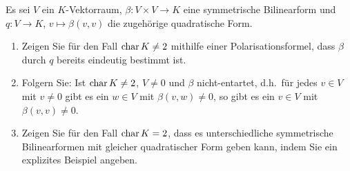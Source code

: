 \begin{question}[subtitle = Die Polarisationsformel(n)]{2}
  Es sei $V$ ein $K$-Vektorraum, $\beta \colon V \times V \to K$ eine symmetrische Bilinearform und $q \colon V \to K$, $v \mapsto \beta(v,v)$ die zugehörige quadratische Form.
  \begin{enumerate}[leftmargin=*]
    \item
      Zeigen Sie für den Fall $\operatorname{char} K \neq 2$ mithilfe einer Polarisationsformel, dass $\beta$ durch $q$ bereits eindeutig bestimmt ist.
    \item
      Folgern Sie:
      Ist $\operatorname{char} K \neq 2$, $V \neq 0$ und $\beta$ nicht-entartet, d.h.\ für jedes $v \in V$ mit $v \neq 0$ gibt es ein $w \in V$ mit $\beta(v, w) \neq 0$, so gibt es ein $v \in V$ mit $\beta(v,v) \neq 0$.
    \item
      Zeigen Sie für den Fall $\operatorname{char} K = 2$, dass es unterschiedliche symmetrische Bilinearformen mit gleicher quadratischer Form geben kann, indem Sie ein explizites Beispiel angeben.
  \end{enumerate}
\end{question}


